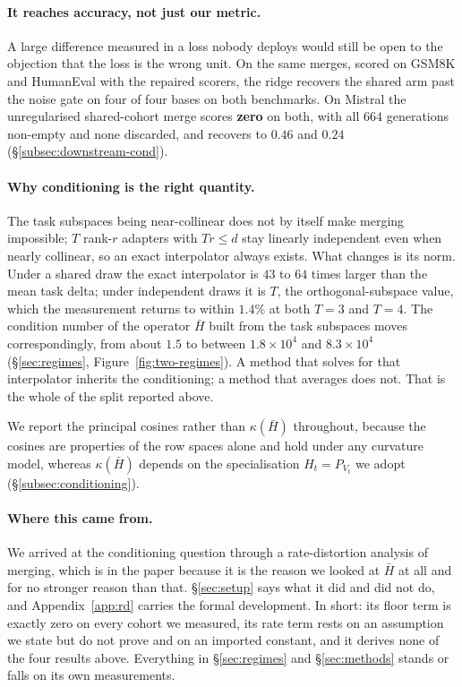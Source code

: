 \paragraph{It reaches accuracy, not just our metric.} A large difference
measured in a loss nobody deploys would still be open to the objection that
the loss is the wrong unit. On the same merges, scored on GSM8K and
HumanEval with the repaired scorers, the ridge recovers the shared arm past
the noise gate on four of four bases on both benchmarks. On Mistral the
unregularised shared-cohort merge scores \textbf{zero} on both, with all
$664$ generations non-empty and none discarded, and recovers to $0.46$ and
$0.24$ (\S\ref{subsec:downstream-cond}).

\paragraph{Why conditioning is the right quantity.} The task subspaces
being near-collinear does not by itself make merging impossible; $T$
rank-$r$ adapters with $Tr \leq d$ stay linearly independent even when
nearly collinear, so an exact interpolator always exists. What changes is
its norm. Under a shared draw the exact interpolator is $43$ to $64$ times
larger than the mean task delta; under independent draws it is $T$, the
orthogonal-subspace value, which the measurement returns to within $1.4\%$
at both $T = 3$ and $T = 4$. The condition number of the operator $\bar H$
built from the task subspaces moves correspondingly, from about $1.5$ to
between $1.8\times10^{4}$ and $8.3\times10^{4}$ (\S\ref{sec:regimes},
Figure~\ref{fig:two-regimes}). A method that solves for that interpolator
inherits the conditioning; a method that averages does not. That is the
whole of the split reported above.

We report the principal cosines rather than $\kappa(\bar H)$ throughout,
because the cosines are properties of the row spaces alone and hold under
any curvature model, whereas $\kappa(\bar H)$ depends on the specialisation
$H_t = P_{V_t}$ we adopt (\S\ref{subsec:conditioning}).

\paragraph{Where this came from.} We arrived at the conditioning question
through a rate-distortion analysis of merging, which is in the paper because
it is the reason we looked at $\bar H$ at all and for no stronger reason than
that. \S\ref{sec:setup} says what it did and did not do, and
Appendix~\ref{app:rd} carries the formal development. In short: its floor
term is exactly zero on every cohort we measured, its rate term rests on an
assumption we state but do not prove and on an imported constant, and it
derives none of the four results above. Everything in \S\ref{sec:regimes} and
\S\ref{sec:methods} stands or falls on its own measurements.

